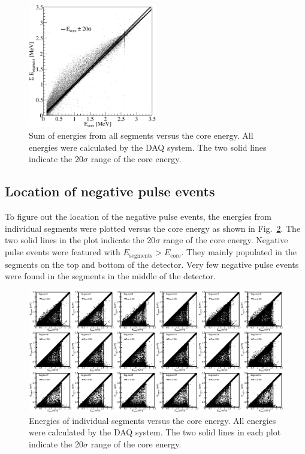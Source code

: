 \begin{figure}[tphb]
\centering
\includegraphics[width=0.5\textwidth]{sEnegPuls}
\caption{Sum of energies from all segments versus the core energy. All energies were calculated by the DAQ system. The two solid lines indicate the 20$\sigma$ range of the core energy.}
\label{fig:ii:sEnegPulse}
\end{figure}

\subsection{Location of negative pulse events}
\label{s:locneg}
To figure out the location of the negative pulse events, the energies from individual segments were plotted versus the core energy as shown in Fig.~\ref{f:ii:EnegPulse}. The two solid lines in the plot indicate the 20$\sigma$ range of the core energy. Negative pulse events were featured with  $E_{\text{segments}} > E_{\text{core}}$. They mainly populated in the segments on the top and bottom of the detector. Very few negative pulse events were found in the segments in the middle of the detector.

\begin{figure}
\centering
\includegraphics{EnegPuls}
\caption{Energies of individual segments versus the core energy. All energies were calculated by the DAQ system. The two solid lines in each plot indicate the 20$\sigma$ range of the core energy.}
\label{f:ii:EnegPulse}
\end{figure}

